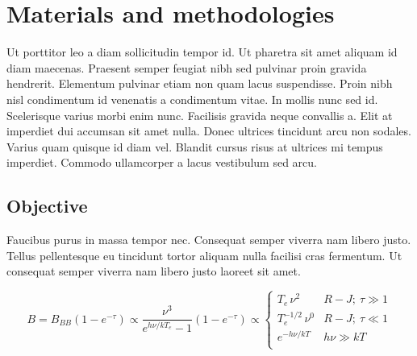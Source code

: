 \chapter{Materials and methodologies}
Ut porttitor leo a diam sollicitudin tempor id. Ut pharetra sit amet aliquam id diam maecenas. Praesent semper feugiat nibh sed pulvinar proin gravida hendrerit. Elementum pulvinar etiam non quam lacus suspendisse. Proin nibh nisl condimentum id venenatis a condimentum vitae. In mollis nunc sed id. Scelerisque varius morbi enim nunc. Facilisis gravida neque convallis a. Elit at imperdiet dui accumsan sit amet nulla. Donec ultrices tincidunt arcu non sodales. Varius quam quisque id diam vel. Blandit cursus risus at ultrices mi tempus imperdiet. Commodo ullamcorper a lacus vestibulum sed arcu. 

\section{Objective}
\label{chap:freefree}
 Faucibus purus in massa tempor nec. Consequat semper viverra nam libero justo. Tellus pellentesque eu tincidunt tortor aliquam nulla facilisi cras fermentum. Ut consequat semper viverra nam libero justo laoreet sit amet.

\begin{equation}\label{eq:c10}
    B=B_{BB}(1-e^{-\tau})\propto \frac{\nu^3}{e^{h\nu/kT_e}-1}(1-e^{-\tau})\propto\begin{cases}
    T_{e}\, \nu^{2} & R-J;\:\tau\gg1\\
    T_{e}^{-1/2}\, \nu^{0} & R-J;\:\tau\ll1\\
    e^{-h\nu /kT} & h\nu\gg kT\\
\end{cases}
\end{equation}
